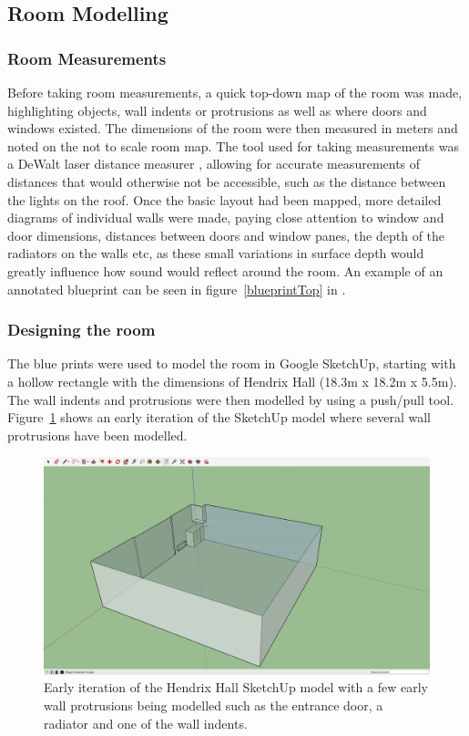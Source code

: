 \documentclass[../../main.tex]{subfiles}
\begin{document}
	\subsection{Room Modelling}

		\subsubsection{Room Measurements}

			Before taking room measurements, a quick top-down map of the room was made, highlighting objects, wall indents or protrusions as well as where doors and windows existed. The dimensions of the room were then measured in meters and noted on the not to scale room map. The tool used for taking measurements was a DeWalt laser distance measurer \cite{dewalt}, allowing for accurate measurements of distances that would otherwise not be accessible, such as the distance between the lights on the roof. Once the basic layout had been mapped, more detailed diagrams of individual walls were made, paying close attention to window and door dimensions, distances between doors and window panes, the depth of the radiators on the walls etc, as these small variations in surface depth would greatly influence how sound would reflect around the room. An example of an annotated blueprint can be seen in figure~\ref{blueprintTop} in .

		\subsubsection{Designing the room}
			\label{designRoom}
			The blue prints were used to model the room in Google SketchUp, starting with a hollow rectangle with the dimensions of Hendrix Hall (18.3m x 18.2m x 5.5m). The wall indents and protrusions were then modelled by using a push/pull tool. Figure~\ref{sku1} shows an early iteration of the SketchUp model where several wall protrusions have been modelled.

			\begin{figure}
				\center\includegraphics[width=\textwidth]{Sections/Implementation/Modelling/images/sku1.png}
				\caption{Early iteration of the Hendrix Hall SketchUp model with a few early wall protrusions being modelled such as the entrance door, a radiator and one of the wall indents.}
				\label{sku1}
			\end{figure}
\end{document}
